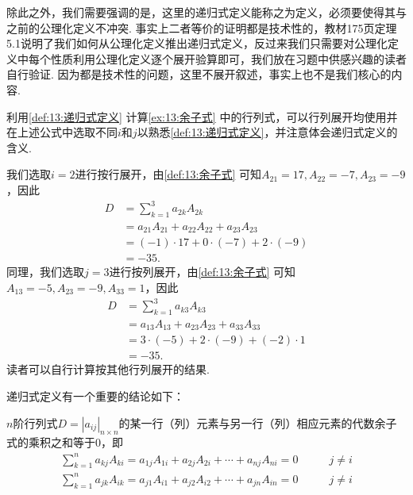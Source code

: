 除此之外，我们需要强调的是，这里的递归式定义能称之为定义，必须要使得其与之前的公理化定义不冲突. 事实上二者等价的证明都是技术性的，教材175页定理5.1说明了我们如何从公理化定义推出递归式定义，反过来我们只需要对公理化定义中每个性质利用公理化定义逐个展开验算即可，我们放在习题中供感兴趣的读者自行验证. 因为都是技术性的问题，这里不展开叙述，事实上也不是我们核心的内容.
\begin{example} \label{ex:13:递归式定义}
    利用\autoref{def:13:递归式定义} 计算\autoref{ex:13:余子式} 中的行列式，可以行列展开均使用并在上述公式中选取不同$i$和$j$以熟悉\autoref*{def:13:递归式定义}，并注意体会递归式定义的含义.
\end{example}

\begin{solution}
    我们选取$i=2$进行按行展开，由\autoref{def:13:余子式} 可知$A_{21}=17,A_{22}=-7,A_{23}=-9$，因此
    \begin{align*}
        D & =\sum_{k=1}^{3}a_{2k}A_{2k}              \\
          & =a_{21}A_{21}+a_{22}A_{22}+a_{23}A_{23}  \\
          & =(-1) \cdot 17+0 \cdot (-7)+2 \cdot (-9) \\
          & =-35.
    \end{align*}
    同理，我们选取$j=3$进行按列展开，由\autoref{def:13:余子式} 可知$A_{13}=-5,A_{23}=-9,A_{33}=1$，因此
    \begin{align*}
        D & =\sum_{k=1}^{3}a_{k3}A_{k3}             \\
          & =a_{13}A_{13}+a_{23}A_{23}+a_{33}A_{33} \\
          & =3 \cdot (-5)+2 \cdot (-9)+(-2) \cdot 1 \\
          & =-35.
    \end{align*}
    读者可以自行计算按其他行列展开的结果.
\end{solution}

递归式定义有一个重要的结论如下：
\begin{theorem}
    $n$阶行列式$D=|a_{ij}|_{n \times n}$的某一行（列）元素与另一行（列）相应元素的代数余子式的乘积之和等于0，即
    \begin{align}
        \label{eq:13:递归式定义3}
        \sum_{k=1}^{n}a_{kj}A_{ki}=a_{1j}A_{1i}+a_{2j}A_{2i}+\cdots+a_{nj}A_{ni}=0 & \qquad j \neq i \\
        \label{eq:13:递归式定义4}
        \sum_{k=1}^{n}a_{jk}A_{ik}=a_{j1}A_{i1}+a_{j2}A_{i2}+\cdots+a_{jn}A_{in}=0 & \qquad j \neq i
    \end{align}
\end{theorem}

